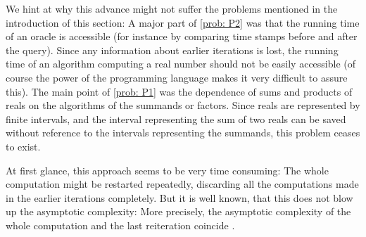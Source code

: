 
We hint at why this advance might not suffer the problems mentioned in the introduction of this section: A major part of \ref{prob: P2} was that the running time of an oracle is accessible (for instance by comparing time stamps before and after the query). Since any information about earlier iterations is lost, the running time of an algorithm computing a real number should not be easily accessible (of course the power of the programming language \cc makes it very difficult to assure this). The main point of \ref{prob: P1} was the dependence of sums and products of reals on the algorithms of the summands or factors. Since reals are represented by finite intervals, and the interval representing the sum of two reals can be saved without reference to the intervals representing the summands, this problem ceases to exist.

At first glance, this approach seems to be very time consuming: The whole computation might be restarted repeatedly, discarding all the computations made in the earlier iterations completely. But it is well known, that this does not blow up the asymptotic complexity: More precisely, the asymptotic complexity of the whole computation and the last reiteration coincide \cite{}.


